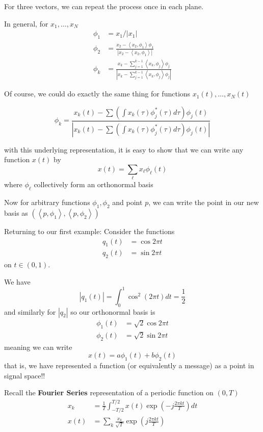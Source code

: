 \documentclass[12pt]{report}
\newcommand{\brak}[1]{\left\langle #1 \right\rangle}
\newcommand{\abs}[1]{\left\vert #1 \right\vert}
\newcommand*{\tbf}[1]{\ifmmode\mathbf{#1}\else\textbf{#1}\fi}
\newenvironment*{tbox}[2][gray]{
    \begin{tcolorbox}[
        parbox=false,
        colback=#1!5!white,
        colframe=#1!75!black,
        breakable,
        title={#2}
    ]}
    {\end{tcolorbox}}
\begin{document}
For three vectors, we can repeat the process once in each plane. 

\begin{tbox}{\textbf{Gram-Schmidt Process:} }
    In general, for $x_1, \dots, x_N$
    \begin{align*}
        \phi_1 &= x_1/\abs{x_1}\\
        \phi_2 &= \frac{x_2 - \brak{x_2, \phi_1} \phi_1}{\abs{x_2 - \brak{x_2, \phi_1}}}\\
        \phi_k &=  \frac{x_k - \sum_{j=1}^{k-1} \brak{x_k, \phi_j} \phi_j}{\abs{x_k - \sum_{j=1}^{k-1} \brak{x_k, \phi_j} \phi_j}}
    \end{align*}
\end{tbox}

Of course, we could do exactly the same thing for functions $x_1(t), \dots, x_N(t)$

\[\phi_k =  \frac{x_k(t) - \sum \left( \int x_k(\tau) \phi_j^*(\tau) d\tau\right) \phi_j(t)}{\abs{x_k(t) - \sum \left( \int x_k(\tau) \phi_j^*(\tau) d\tau\right) \phi_j(t)}}\]

with this underlying representation, it is easy to show that we can write any function $x(t)$ by 
\[x(t) = \sum_{\ell} x_{\ell} \phi_{\ell}(t)\]
where $\phi_{\ell}$ collectively form an orthonormal basis 

Now for arbitrary functions $\phi_1, \phi_2$ and point $p$, we can write the point in our new basis as $(\brak{ p, \phi_1}, \brak{p, \phi_2})$

Returning to our first example: Consider the functions
\begin{align*}
    q_1(t) &= \cos 2 \pi t\\
    q_2(t) &=\sin 2 \pi t 
\end{align*}
on $t\in (0,1)$.

We have 
\[\abs{q_1(t)}=\int_0^1 \cos^2(2\pi t) dt = \frac{1}{2}\]
and similarly for $\abs{q_2}$ so our orthonormal basis is 
\begin{align*}
    \phi_1(t)&=\sqrt 2 \cos 2 \pi t\\
    \phi_2(t)&=\sqrt 2 \sin 2 \pi t  
\end{align*}
meaning we can write 
\[x(t) = a \phi_1(t) + b \phi_2(t) \]
that is, we have represented a function (or equivalently a message) as a point in signal space!! 

Recall the \tbf{Fourier Series} representation of a periodic function on $(0, T)$
\begin{align*}
    x_k &= \frac 1 T \int_{-T/2}^{T/2} x(t) \exp\left(- j \frac{2\pi k t}{T}\right) dt \\
    x(t) &= \sum_k  \frac{x_k}{\sqrt{T}} \exp\left(j \frac{2\pi k t}{T}\right)
\end{align*}
\end{document}
